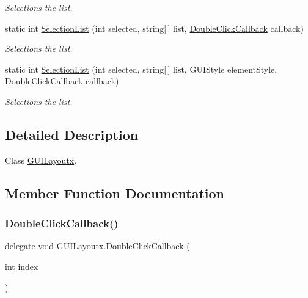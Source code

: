 \begin{DoxyCompactItemize}
\begin{DoxyCompactList}\small\item\em Selections the list. \end{DoxyCompactList}\item 
static int \hyperlink{class_g_u_i_layoutx_afc5bda68b00aa83ce169df14d87ff979}{Selection\+List} (int selected, string\mbox{[}$\,$\mbox{]} list, \hyperlink{class_g_u_i_layoutx_ad636807bfe6952505099a4c3be54080d}{Double\+Click\+Callback} callback)
\begin{DoxyCompactList}\small\item\em Selections the list. \end{DoxyCompactList}\item 
static int \hyperlink{class_g_u_i_layoutx_a8149d23447ddc591ce33d74a897ceea1}{Selection\+List} (int selected, string\mbox{[}$\,$\mbox{]} list, G\+U\+I\+Style element\+Style, \hyperlink{class_g_u_i_layoutx_ad636807bfe6952505099a4c3be54080d}{Double\+Click\+Callback} callback)
\begin{DoxyCompactList}\small\item\em Selections the list. \end{DoxyCompactList}\end{DoxyCompactItemize}


\subsection{Detailed Description}
Class \hyperlink{class_g_u_i_layoutx}{G\+U\+I\+Layoutx}. 



\subsection{Member Function Documentation}
\mbox{\label{class_g_u_i_layoutx_ad636807bfe6952505099a4c3be54080d}} 
\subsubsection{\texorpdfstring{Double\+Click\+Callback()}{DoubleClickCallback()}}
{\footnotesize\ttfamily delegate void G\+U\+I\+Layoutx.\+Double\+Click\+Callback (\begin{DoxyParamCaption}\item[{int}]{index }\end{DoxyParamCaption})}



